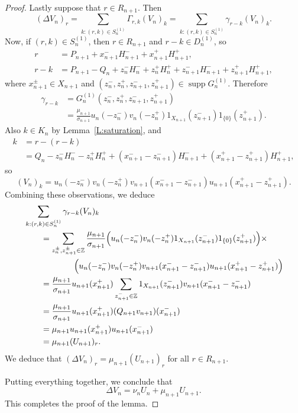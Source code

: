 \documentclass[10pt,a4paper]{amsart}
\newcommand{\ZZ}{\mathbb{Z}}
\DeclareMathOperator{\supp}{supp}
\begin{document}
\begin{proof}
Lastly suppose that $r\in R_{n+1}$. Then
\[
(\Delta V_n)_r
=\sum_{k:(r,k)\in S_n^{(1)}}\Gamma_{r,k}(V_n)_k
=\sum_{k:(r,k)\in S_n^{(1)}}\gamma_{r-k}(V_n)_k.
\]
Now, if $(r,k)\in S_n^{(1)}$, then $r\in R_{n+1}$ and $r-k\in D_n^{(1)}$, so
\begin{align*}
r&=P_{n+1}+x_{n+1}^{-}H_{n+1}^-+x_{n+1}^+H_{n+1}^+,\\
r-k&=P_{n+1}-Q_n+z_n^-H_n^-+z_n^+H_n^++z_{n+1}^-H_{n+1}^-+z_{n+1}^+H_{n+1}^+,
\end{align*}
where $x_{n+1}^\pm\in X_{n+1}$ and $(z_n^-,z_n^+,z_{n+1}^-,z_{n+1}^+)\in\supp G_n^{(1)}$.
Therefore
\begin{align*}
\gamma_{r-k}
&=G_n^{(1)}(z_n^-,z_n^+,z_{n+1}^-,z_{n+1}^+)\\
&=\frac{\mu_{n+1}}{\sigma_{n+1}}u_n(-z_n^-)v_n(-z_n^+)1_{X_{n+1}}(z_{n+1}^-)1_{\{0\}}(z_{n+1}^+).
\end{align*}
Also $k\in K_n$ by Lemma~\ref{L:saturation}, and 
\begin{align*}
k&=r-(r-k)\\
&=Q_n-z_n^-H_n^--z_n^+H_n^++(x_{n+1}^--z_{n+1}^-)H_{n+1}^-+(x_{n+1}^+-z_{n+1}^+)H_{n+1}^+,
\end{align*}
so
\[ 
(V_n)_{k}=u_n(-z_n^-)v_n(-z_n^+)v_{n+1}(x_{n+1}^--z_{n+1}^-)u_{n+1}(x_{n+1}^+-z_{n+1}^+).
\]
Combining these observations, we deduce
\begin{align*}
&\sum_{k:(r,k)\in S_n^{(1)}}\gamma_{r-k}(V_n)_k\\
&\qquad=\sum_{z_n^\pm,z_{n+1}^\pm\in\ZZ}\frac{\mu_{n+1}}{\sigma_{n+1}}\Bigl(u_n(-z_n^-)v_n(-z_n^+)1_{X_{n+1}}(z_{n+1}^-)1_{\{0\}}(z_{n+1}^+)\Bigr)\times\\
&\qquad\qquad\qquad\Bigl(u_n(-z_n^-)v_n(-z_n^+)v_{n+1}(x_{n+1}^--z_{n+1}^-)u_{n+1}(x_{n+1}^+-z_{n+1}^+)\Bigr)\\
&\qquad=\frac{\mu_{n+1}}{\sigma_{n+1}}u_{n+1}(x_{n+1}^+)\sum_{z_{n+1}^-\in\ZZ}1_{X_{n+1}}(z_{n+1}^-)v_{n+1}(x_{n+1}^--z_{n+1}^-)\\
&\qquad=\frac{\mu_{n+1}}{\sigma_{n+1}}u_{n+1}(x_{n+1}^+)(Q_{n+1}v_{n+1})(x_{n+1}^-)\\
&\qquad=\mu_{n+1}u_{n+1}(x_{n+1}^+)u_{n+1}(x_{n+1}^-)\\
&\qquad=\mu_{n+1}(U_{n+1})_r.
\end{align*}
We deduce that $(\Delta V_n)_r=\mu_{n+1}(U_{n+1})_r$ for all 
$r\in R_{n+1}$.


Putting everything together, we conclude that
\[
\Delta V_n=\nu_n U_n+\mu_{n+1}U_{n+1}.
\]
This completes the proof of the lemma.
\end{proof}
\end{document}

